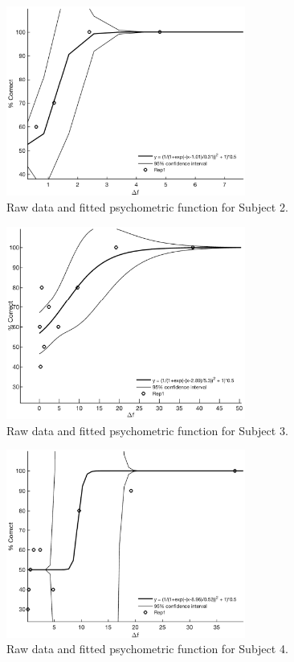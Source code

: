 \begin{figure}[H]
\centering
\includegraphics[width = 0.7\textwidth]{Figure/Vores_Figurer/Subject2} 
\caption{Raw data and fitted psychometric function for Subject 2.}
\label{fig:Subject2}
\end{figure}

\begin{figure}[H]
\centering
\includegraphics[width = 0.7\textwidth]{Figure/Vores_Figurer/Subject3} 
\caption{Raw data and fitted psychometric function for Subject 3.}
\label{fig:Subject3}
\end{figure}

\begin{figure}[H]
\centering
\includegraphics[width = 0.7\textwidth]{Figure/Vores_Figurer/Subject4} 
\caption{Raw data and fitted psychometric function for Subject 4.}
\label{fig:Subject4}
\end{figure}

